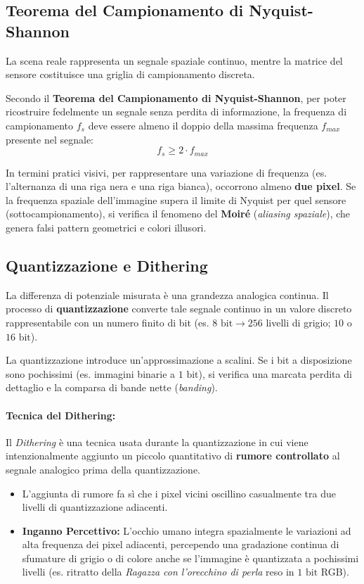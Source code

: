 \subsection{Teorema del Campionamento di Nyquist-Shannon}
La scena reale rappresenta un segnale spaziale continuo, mentre la matrice del sensore costituisce una griglia di campionamento discreta.

Secondo il \textbf{Teorema del Campionamento di Nyquist-Shannon}, per poter ricostruire fedelmente un segnale senza perdita di informazione, la frequenza di campionamento $f_s$ deve essere almeno il doppio della massima frequenza $f_{max}$ presente nel segnale:
\begin{equation}
    f_s \ge 2 \cdot f_{max}
\end{equation}

In termini pratici visivi, per rappresentare una variazione di frequenza (es. l'alternanza di una riga nera e una riga bianca), occorrono almeno \textbf{due pixel}. Se la frequenza spaziale dell'immagine supera il limite di Nyquist per quel sensore (sottocampionamento), si verifica il fenomeno del \textbf{Moiré} (\textit{aliasing spaziale}), che genera falsi pattern geometrici e colori illusori.

\subsection{Quantizzazione e Dithering}
La differenza di potenziale misurata è una grandezza analogica continua. Il processo di \textbf{quantizzazione} converte tale segnale continuo in un valore discreto rappresentabile con un numero finito di bit (es. $8\text{ bit} \rightarrow 256$ livelli di grigio; $10$ o $16\text{ bit}$).

La quantizzazione introduce un'approssimazione a scalini. Se i bit a disposizione sono pochissimi (es. immagini binarie a $1\text{ bit}$), si verifica una marcata perdita di dettaglio e la comparsa di bande nette (\textit{banding}).

\paragraph{Tecnica del Dithering:}
Il \textit{Dithering} è una tecnica usata durante la quantizzazione in cui viene intenzionalmente aggiunto un piccolo quantitativo di \textbf{rumore controllato} al segnale analogico prima della quantizzazione. 
\begin{itemize}
    \item L'aggiunta di rumore fa sì che i pixel vicini oscillino casualmente tra due livelli di quantizzazione adiacenti.
    \item \textbf{Inganno Percettivo:} L'occhio umano integra spazialmente le variazioni ad alta frequenza dei pixel adiacenti, percependo una gradazione continua di sfumature di grigio o di colore anche se l'immagine è quantizzata a pochissimi livelli (es. ritratto della \textit{Ragazza con l'orecchino di perla} reso in $1\text{ bit}$ RGB).
\end{itemize}

